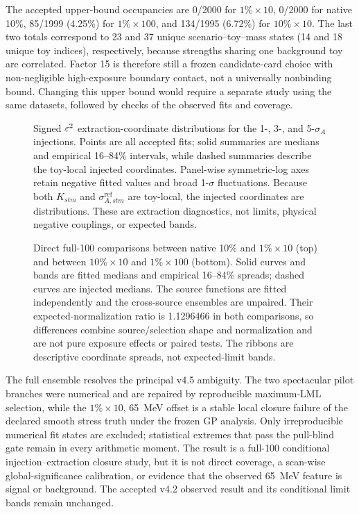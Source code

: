 The accepted upper-bound occupancies are 0/2000 for $1\%\times10$, 0/2000 for
native 10\%, 85/1999 (4.25\%) for $1\%\times100$, and 134/1995 (6.72\%) for
$10\%\times10$.  The last two totals correspond to 23 and 37 unique
scenario--toy--mass states (14 and 18 unique toy indices), respectively, because
strengths sharing one background toy are correlated.  Factor 15 is therefore still a frozen candidate-card choice with
non-negligible high-exposure boundary contact, not a universally nonbinding bound.
Changing this upper bound would require a separate study using the same
datasets, followed by checks of the observed fits and coverage.

\begin{figure}[p]
\centering
{}
\caption{Signed $\varepsilon^2$ extraction-coordinate distributions for the 1-, 3-, and
5-$\sigma_A$ injections.  Points are all accepted fits; solid summaries are medians
and empirical 16--84\% intervals, while dashed summaries describe the toy-local
injected coordinates.  Panel-wise symmetric-log axes retain negative fitted values
and broad 1-$\sigma$ fluctuations.  Because both $K_{stm}$ and
$\sigma^{\mathrm{ref}}_{A,stm}$ are toy-local, the injected coordinates are
distributions.  These are extraction diagnostics, not limits, physical negative
couplings, or expected bands.}
\label{fig:v501-v4p6-eps2-distributions}
\end{figure}

\begin{figure}[p]
\centering
{}
\caption{Direct full-100 comparisons between native 10\% and $1\%\times10$ (top)
and between $10\%\times10$ and $1\%\times100$ (bottom).  Solid curves and bands are
fitted medians and empirical 16--84\% spreads; dashed curves are injected medians.
The source functions are fitted independently and the cross-source ensembles are
unpaired.  Their expected-normalization ratio is 1.1296466 in both comparisons, so
differences combine source/selection shape and normalization and are not pure exposure
effects or paired tests.  The ribbons are descriptive coordinate spreads, not
expected-limit bands.}
\label{fig:v501-v4p6-direct-eps2-comparisons}
\end{figure}

\clearpage
The full ensemble resolves the principal v4.5 ambiguity.  The two spectacular pilot
branches were numerical and are repaired by reproducible maximum-LML selection, while
the $1\%\times10$, 65~MeV offset is a stable local closure failure of the declared
smooth stress truth under the frozen GP analysis.  Only irreproducible numerical fit
states are excluded; statistical extremes that pass the pull-blind gate remain in every
arithmetic moment.
The result is a full-100 conditional injection--extraction closure study, but it is
not direct \CLs{} coverage, a scan-wise global-significance calibration, or evidence
that the observed 65~MeV feature is signal or background.  The accepted v4.2 observed
result and its conditional limit bands remain unchanged.

